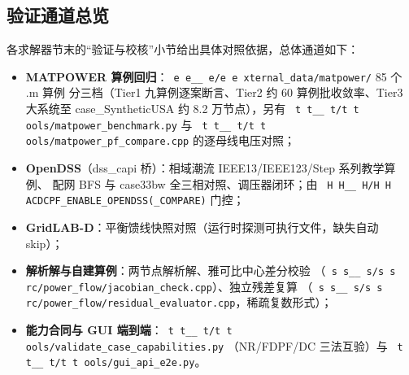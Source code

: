\documentclass[UTF8,fontset=fandol,a4paper,11pt]{ctexart}
\makeatletter
\newcommand{\srcpath}[1]{\texttt{\src@scan#1\src@stop}}
\def\src@scan#1{%
  \ifx#1\src@stop
  \else
    \ifx#1\_\_\allowbreak\else
    \ifx#1/#1\allowbreak\else
    #1\fi\fi
    \expandafter\src@scan
  \fi}
\makeatother
\begin{document}
\subsection{验证通道总览}
各求解器节末的“验证与校核”小节给出具体对照依据，总体通道如下：
\begin{itemize}
  \item \textbf{MATPOWER 算例回归}：\srcpath{external\_data/matpower/} 85 个 .m 算例
        分三档（Tier1 九算例逐案断言、Tier2 约 60 算例批收敛率、Tier3 大系统至
        case\_SyntheticUSA 约 8.2 万节点），另有 \srcpath{tools/matpower\_benchmark.py}
        与 \srcpath{tools/matpower\_pf\_compare.cpp} 的逐母线电压对照；
  \item \textbf{OpenDSS}（dss\_capi 桥）：相域潮流 IEEE13/IEEE123/Step 系列教学算例、
        配网 BFS 与 case33bw 全三相对照、调压器闭环；由
        \srcpath{HACDCPF\_ENABLE\_OPENDSS(\_COMPARE)} 门控；
  \item \textbf{GridLAB-D}：平衡馈线快照对照（运行时探测可执行文件，缺失自动 skip）；
  \item \textbf{解析解与自建算例}：两节点解析解、雅可比中心差分校验
        （\srcpath{src/power\_flow/jacobian\_check.cpp}）、独立残差复算
        （\srcpath{src/power\_flow/residual\_evaluator.cpp}，稀疏复数形式）；
  \item \textbf{能力合同与 GUI 端到端}：\srcpath{tools/validate\_case\_capabilities.py}
        （NR/FDPF/DC 三法互验）与 \srcpath{tools/gui\_api\_e2e.py}。
\end{itemize}
\end{document}
